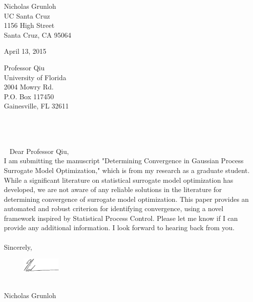 \documentclass[10pt]{article}
\newcommand{\coverHeader}[5]{
        \begin{minipage}[h!]{0.37\textwidth}
                {#1}
                {#2}
                {#3}
                {#4}
                {#5}
        \end{minipage}
}
\begin{document}

\noindent   %
\coverHeader{Nicholas Grunloh\\}
	    {UC Santa Cruz\\}
            {1156 High Street\\}
            {Santa Cruz, CA 95064}{}

\vspace{6mm}
\noindent
April 13, 2015
\vspace{6mm}

\noindent   %
\coverHeader{}
            {Professor Qiu\\}
            {University of Florida\\}
            {2004 Mowry Rd.\\P.O. Box 117450\\}
            {Gainesville, FL 32611\\}
\\\\\\\
\noindent
Dear Professor Qiu,\\

\onehalfspacing
I am submitting the manuscript "Determining Convergence in Gaussian Process Surrogate Model Optimization," which is from my research as a graduate student.
While a significant literature on statistical surrogate model optimization has developed, we are not aware of any reliable solutions in the literature for determining convergence of surrogate model optimization.
This paper provides an automated and robust criterion for identifying convergence, using a novel framework inspired by Statistical Process Control.
Please let me know if I can provide any additional information.
I look forward to hearing back from you.
\\\\
\noindent
Sincerely,
\begin{figure}[h!]
  \includegraphics[width=0.17\textwidth]{sig1.png}
\end{figure}
\\
Nicholas Grunloh
\end{document}
